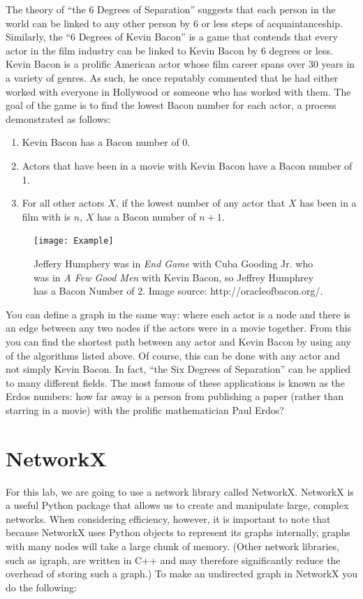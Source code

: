 The theory of ``the 6 Degrees of Separation'' suggests that each person in the world can be linked to any other person by 6 or less steps of acquaintanceship.
Similarly, the ``6 Degrees of Kevin Bacon'' is a game that contends that every actor in the film industry can be linked to Kevin Bacon by 6 degrees or less. Kevin Bacon 
is a prolific American actor whose film career spans over 30 years in a variety of genres. As such, he once reputably commented that he had either worked with everyone in 
Hollywood or someone who has worked with them. The goal of the game is to find the lowest Bacon number for each actor, a process demonstrated as follows:
\begin{enumerate}
\item Kevin Bacon has a Bacon number of 0.
\item Actors that have been in a movie with Kevin Bacon have a Bacon number of 1.
\item For all other actors $X$, if the lowest number of any actor that $X$ has been in a film with is $n$, $X$ has a Bacon number of $n+1$.
\end{enumerate}

\begin{figure}[h]
\texttt{[image: Example]}
\caption{Jeffery Humphery was in \emph{End Game} with Cuba Gooding Jr. who was in \emph{A Few Good Men} with Kevin Bacon, so Jeffrey Humphrey has a Bacon Number of 2.  Image source: http://oracleofbacon.org/.}
\end{figure}

You can define a graph in the same way: where each actor is a node and there is an edge between any two nodes if the actors were in a movie together. From this you can find 
the shortest path between any actor and Kevin Bacon by using any of the algorithms listed above. Of course, this can be done with any actor and not simply Kevin Bacon. In 
fact, ``the Six Degrees of Separation'' can be applied to many different fields. The most famous of these applications is known as the Erdos numbers: how far away is a person
 from publishing a paper (rather than starring in a movie) with the prolific mathematician Paul Erdos?

\section*{NetworkX}
For this lab, we are going to use a network library called NetworkX. NetworkX is a useful Python package that allows us to create and manipulate large, complex networks.  
When considering efficiency, however, it is important to note that because NetworkX uses Python objects to represent its graphs internally, graphs with many nodes will 
take a large chunk of memory.  (Other network libraries, such as igraph, are written in C++ and may therefore significantly reduce the overhead of storing such a graph.)
To make an undirected graph in NetworkX you do the following:

